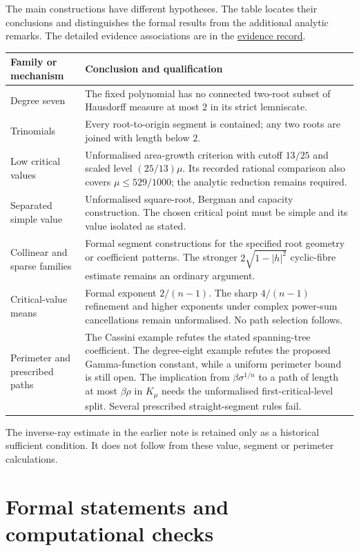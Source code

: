 \documentclass[11pt]{article}
\begin{document}
The main constructions have different hypotheses. The table locates
their conclusions and distinguishes the formal results from the
additional analytic remarks. The detailed evidence associations are
in the \href{\evidencerecordurl}{evidence record}.
\begin{center}\small
\begin{tabular}{p{.24\linewidth}p{.65\linewidth}}
\toprule
Family or mechanism & Conclusion and qualification \\
\midrule
Degree seven & The fixed polynomial has no connected two-root subset
of Hausdorff measure at most $2$ in its strict lemniscate. \\
Trinomials & Every root-to-origin segment is contained; any two roots
are joined with length below $2$. \\
Low critical values & Unformalised area-growth criterion with cutoff
$13/25$ and scaled level $(25/13)\mu$. Its recorded rational comparison
also covers $\mu\le529/1000$; the analytic reduction remains required. \\
Separated simple value & Unformalised square-root, Bergman and capacity
construction. The chosen critical point must be simple and its value
isolated as stated. \\
Collinear and sparse families & Formal segment constructions for the
specified root geometry or coefficient patterns. The stronger
$2\sqrt{1-|h|^2}$ cyclic-fibre estimate remains an ordinary argument. \\
Critical-value means & Formal exponent $2/(n-1)$. The sharp
$4/(n-1)$ refinement and higher exponents under complex power-sum
cancellations remain unformalised. No path selection follows. \\
Perimeter and prescribed paths & The Cassini example refutes the stated
spanning-tree coefficient. The degree-eight example refutes the proposed
Gamma-function constant, while a uniform perimeter bound is still open.
The implication from $\beta\sigma^{1/n}$ to a path of length at most
$\beta\rho$ in $K_\mu$ needs the unformalised first-critical-level split.
Several prescribed straight-segment rules fail. \\
\bottomrule
\end{tabular}\end{center}
The inverse-ray estimate in the earlier note is retained only as a
historical sufficient condition. It does not follow from these value,
segment or perimeter calculations.

\section{Formal statements and computational checks}\label{sec:verification-notes}
\end{document}
